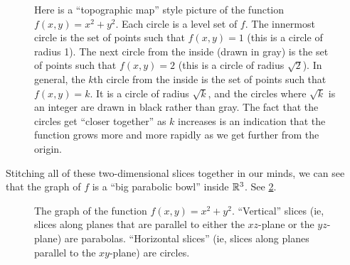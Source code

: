 \begin{figure}[ht]
\begin{center}
	\end{center}
	\caption{Here is a ``topographic map'' style picture of the function $f(x,y) = x^2 + y^2$. Each circle is a level set of $f$. The innermost circle is the set of points such that $f(x,y) = 1$ (this is a circle of radius 1). The next circle from the inside (drawn in gray) is the set of points such that $f(x,y) = 2$ (this is a circle of radius $\sqrt{2}$). In general, the $k$th circle from the inside is the set of points such that $f(x,y) = k$. It is a circle of radius $\sqrt{k}$, and the circles where $\sqrt{k}$ is an integer are drawn in black rather than gray. The fact that the circles get ``closer together'' as $k$ increases is an indication that the function grows more and more rapidly as we get further from the origin. } \label{multi-introductory-example-level-sets}
\end{figure}


Stitching all of these two-dimensional slices together in our minds, we can see that the graph of $f$ is a ``big parabolic bowl'' inside $\mathbb{R}^3$. See \cref{multi-introductory-example-graph}. 

\begin{figure}[ht]
	\begin{center}
	\end{center}
	\caption{The graph of the function  $f(x,y) = x^2 + y^2$. ``Vertical'' slices (ie, slices along planes that are parallel to either the $xz$-plane or the $yz$-plane) are parabolas. ``Horizontal slices'' (ie, slices along planes parallel to the $xy$-plane) are circles.} \label{multi-introductory-example-graph}
\end{figure}

